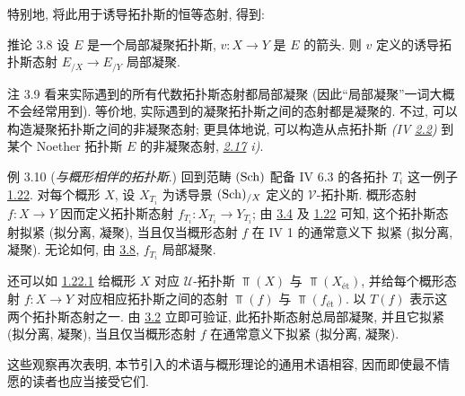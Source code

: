 特别地, 将此用于诱导拓扑斯的恒等态射, 得到:

\begin{enonce*}{推论 3.8}
设 $E$ 是一个局部凝聚拓扑斯, $v:X\to Y$ 是 $E$ 的箭头.
则 $v$ 定义的诱导拓扑斯态射 $E_{/X}\to E_{/Y}$ 局部凝聚.
\end{enonce*}

\begin{enonce*}{注 3.9}
看来\pageoriginale{}实际遇到的所有代数拓扑斯态射都局部凝聚
(因此“局部凝聚”一词大概不会经常用到).
等价地, 实际遇到的凝聚拓扑斯之间的态射都是凝聚的.
不过, 可以构造凝聚拓扑斯之间的非凝聚态射;
更具体地说, 可以构造从点拓扑斯
\emph{(IV \hyperref[IV.subsec2.2]{2.2})}
到某个 Noether 拓扑斯 $E$ 的非凝聚态射,
\emph{\cf \hyperref[VI.exer2.17]{2.17} i)}.
\end{enonce*}

\begin{enonce*}[remark]{例 3.10}
(\emph{与概形相伴的拓扑斯}.)
回到范畴 $(\operatorname{Sch})$ 配备 \SGA IV 6.3 的各拓扑 $T_i$
这一例子 \hyperref[VI.subsec1.22]{1.22}.
对每个概形 $X$,
设 $X_{T_i}$ 为诱导景 $(\operatorname{Sch})_{/X}$ 定义的 $𝒱$-拓扑斯.
概形态射 $f:X\to Y$ 因而定义拓扑斯态射
$f_{T_i}:X_{T_i}\to Y_{T_i}$;
由 \hyperref[VI.prop3.4]{3.4} 及 \hyperref[VI.subsec1.22]{1.22} 可知,
这个拓扑斯态射拟紧 (\resp 拟分离, \resp 凝聚),
当且仅当概形态射 $f$ 在 \EGA IV 1 的通常意义下
拟紧 (\resp 拟分离, \resp 凝聚).
无论如何, 由 \hyperref[VI.cor3.8]{3.8}, $f_{T_i}$ 局部凝聚.

还可以如 \hyperref[VI.subsubsec1.22.1]{1.22.1}
给概形 $X$ 对应 $𝒰$-拓扑斯 $\Top(X)$ 与 $\Top(X_{\text{ét}})$,
并给每个概形态射 $f:X\to Y$
对应相应拓扑斯之间的态射 $\Top(f)$ 与 $\Top(f_{\text{ét}})$.
以 $T(f)$ 表示这两个拓扑斯态射之一.\pageoriginale{}
由 \hyperref[VI.prop3.2]{3.2} 立即可验证,
此拓扑斯态射总局部凝聚,
并且它拟紧 (\resp 拟分离, \resp 凝聚),
当且仅当概形态射 $f$ 在通常意义下拟紧
(\resp 拟分离, \resp 凝聚).

这些观察再次表明,
本节引入的术语与概形理论的通用术语相容,
因而即使最不情愿的读者也应当接受它们.
\end{enonce*}

